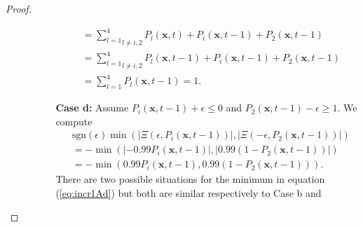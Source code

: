 \documentclass[\main/thesis.tex]{subfiles}
\begin{document}
\begin{proof}
\begin{itemize}
\begin{itemize}
\begin{itemize}
\begin{align*}
                           	                          &{=} \underset{l {\ne} i, 2}{\sum_{l{=}1}^4} P_l(\boldsymbol{x}, t)
                           	                           {+} P_i(\boldsymbol{x}, t{-}1) {+} P_2(\boldsymbol{x}, t{-}1) \\
                           	                          &{=} \underset{l {\ne} i, 2}{\sum_{l{=}1}^4}P_l(\boldsymbol{x},t{-}1) 
                           	                           {+} P_i(\boldsymbol{x}, t{-}1) {+} P_2(\boldsymbol{x}, t{-}1) \\
                           	                          &{=} \sum_{l{=}1}^4 P_l(\boldsymbol{x}, t{-}1) {=} 1.
                           	                        \end{align*}
                               \item[{\bf Case d:}] Assume $P_i(\boldsymbol{x}, t{-}1) {+} \epsilon {\le} 0$ 
                           	                        and $P_2(\boldsymbol{x}, t{-}1) {-} \epsilon {\ge} 1$. 
                           	                        We compute 
                           	                        \begin{align*}
                           	                          &\text{sgn}(\epsilon) \min(|\Xi(\epsilon, P_i(\boldsymbol{x},t{-}1))|, 
                                         	                                     |\Xi({-}\epsilon,
                                         	                                          P_2(\boldsymbol{x}, t{-}1))|)
                           	                          \\ 
                           	                          &{=} {\minus}\min(|{\minus}0.99 P_i(\boldsymbol{x}, t{-}1)|,
                           	                                       |0.99 (1{-}P_2(\boldsymbol{x}, t{-}1))|) \\
                           	                          &{=} {\minus} \min(0.99 P_i(\boldsymbol{x}, t{-}1),
                           	                                        0.99 (1{-}P_2(\boldsymbol{x}, t{-}1))).
                           	                          \tag{10}
                           	                          \label{eq:incr1Ad}
                           	                        \end{align*}
                           	                        There are two possible situations for the minimum in equation 
                           	                        (\ref{eq:incr1Ad}) but both are similar respectively to Case b and 

\end{itemize}
\end{itemize}
\end{itemize}
\end{proof}
\end{document}
